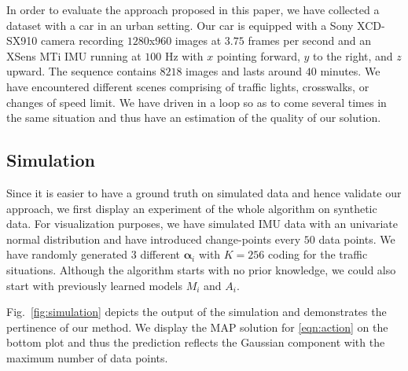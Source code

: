In order to evaluate the approach proposed in this paper, we have collected
a dataset with a car in an urban setting. Our car is equipped with a Sony
XCD-SX910 camera recording $1280$x$960$ images at $3.75$ frames per second and
an XSens MTi IMU running at $100$ Hz with $x$ pointing forward, $y$ to the
right, and $z$ upward. The sequence contains $8218$ images and lasts around $40$
minutes. We have encountered different scenes comprising of traffic lights,
crosswalks, or changes of speed limit. We have driven in a loop so as to come
several times in the same situation and thus have an estimation of the quality
of our solution.

\subsection{Simulation}
Since it is easier to have a ground truth on simulated data and hence validate
our approach, we first display an experiment of the whole algorithm on synthetic
data. For visualization purposes, we have simulated IMU data with an univariate
normal distribution and have introduced change-points every $50$ data points. We
have randomly generated 3 different $\boldsymbol{\alpha}_i$ with $K=256$ coding
for the traffic situations. Although the algorithm starts with no prior
knowledge, we could also start with previously learned models $M_i$ and $A_i$.

Fig.~\ref{fig:simulation} depicts the output of the simulation and demonstrates
the pertinence of our method. We display the MAP solution for \eqref{eqn:action}
on the bottom plot and thus the prediction reflects the Gaussian component with
the maximum number of data points.

